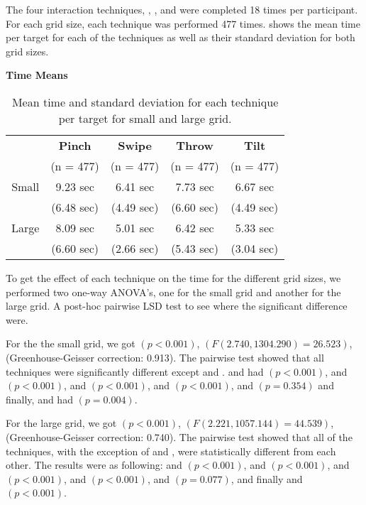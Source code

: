 The four interaction techniques, \pinch, \swipe, \throw and \tilt were completed 18 times per participant. 
For each grid size, each technique was performed 477 times. 
 shows the mean time per target for each of the techniques as well as their standard deviation for both grid sizes. 
\begin{table}[H]
	\centering
	\textbf{Time Means}\\[4pt]
	\begin{adjustbox}{width=\columnwidth}
	\begin{tabular}{|c|c|c|c|c|}
		\hline
		\rowcolor[HTML]{9B9B9B} 
		 & \textbf{Pinch} & \textbf{Swipe} & \textbf{Throw} & \textbf{Tilt} \\ 
		 \rowcolor[HTML]{9B9B9B} 
		 & (n = 477) & (n = 477) & (n = 477) & (n = 477) \\ \hline
		Small & 9.23 sec        & 6.41 sec          & 7.73 sec          & 6.67 sec         \\
		 & (6.48 sec)        & (4.49 sec)          & (6.60 sec)         & (4.49 sec)         \\ \hline
		Large & 8.09 sec         & 5.01 sec          & 6.42 sec          & 5.33 sec         \\
		 & (6.60 sec)         & (2.66 sec)          & (5.43 sec)      & (3.04 sec)         \\ \hline
	\end{tabular}
	\end{adjustbox}
	\caption{Mean time and standard deviation for each technique per target for small and large grid.}
	\label{tab:meanTimesTechnique}
\end{table}

To get the effect of each technique on the time for the different grid sizes, we performed two one-way ANOVA's, one for the small grid and another for the large grid.
A post-hoc pairwise LSD test to see where the significant difference were.

For the the small grid, we got $(p<0.001)$, $(F(2.740, 1304.290)=26.523)$, (Greenhouse-Geisser correction: 0.913).
The pairwise test showed that all techniques were significantly different except \swipe and \tilt. 
\pinch and \swipe had $(p < 0.001)$, 
\pinch and \throw $(p <0.001)$, 
\pinch and \tilt $(p < 0.001)$, 
\swipe and \throw $(p < 0.001)$, 
\swipe and \tilt $(p = 0.354)$ and finally, 
\throw and \tilt had $(p = 0.004)$. 

For the large grid, we got $(p<0.001)$, $(F(2.221, 1057.144)=44.539)$, (Greenhouse-Geisser correction: 0.740).
The pairwise test showed that all of the techniques, with the exception of \swipe and \tilt, were statistically different from each other. The results were as following: 
\pinch and \swipe $(p<0.001)$, 
\pinch and \throw $(p<0.001)$, 
\pinch and \tilt $(p<0.001)$, 
\swipe and \throw $(p<0.001)$, 
\swipe and \tilt $(p=0.077)$, and finally 
\throw and \tilt $(p<0.001)$.

